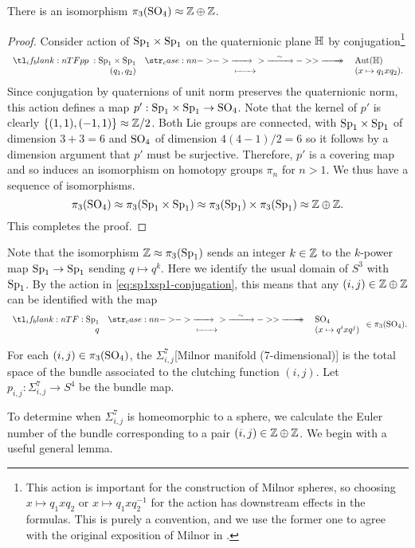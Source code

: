 \begin{proposition}\label{prop:3rd-homotopy-SO4}
	There is an isomorphism $\pi_3(\mathrm{SO}_4)\approx \mathbb{Z}\oplus \mathbb{Z}$.
\end{proposition}
\begin{proof}
	Consider action of $\mathrm{Sp}_1\times \mathrm{Sp}_1$ on the quaternionic plane $\mathbb{H}$ by conjugation\footnote{This action is important for the construction of Milnor spheres, so choosing $x\mapsto q_1xq_2$ or $x\mapsto q_1xq_2^{-1}$ for the action has downstream effects in the formulas. This is purely a convention, and we use the former one to agree with the original exposition of Milnor in \cite{milnor1956manifolds}.}
	\begin{equation}\label{eq:sp1xsp1-conjugation}
		\lkxfunc{p}{\Sp_1\times \Sp_1}{\Aut(\HH)}{(q_1,q_2)}{(x\mapsto q_1xq_2).}
	\end{equation}
	Since conjugation by quaternions of unit norm preserves the quaternionic norm, this action defines a map $p' : \mathrm{Sp}_1\times \mathrm{Sp}_1\to\mathrm{SO}_4$.
	Note that the kernel of $p'$ is clearly $\{(1,1),(-1,1)\}\approx \mathbb{Z}/2$. Both Lie groups are connected, with $\mathrm{Sp}_1\times \mathrm{Sp}_1$ of dimension $3+3=6$ and $\mathrm{SO}_4$ of dimension $4(4-1)/2=6$ so it follows by a dimension argument that $p'$ must be surjective. Therefore, $p'$ is a covering map and so induces an isomorphism on homotopy groups $\pi_n$ for $n>1$. We thus have a sequence of isomorphisms.
	\[
		\pi_3(\mathrm{SO}_4)\approx \pi_3(\mathrm{Sp}_1\times \mathrm{Sp}_1)\approx \pi_3(\mathrm{Sp}_1)\times \pi_3(\mathrm{Sp}_1) \approx \mathbb{Z}\oplus \mathbb{Z}.
	\]
	This completes the proof.
\end{proof}

Note that the isomorphism $\mathbb{Z}\approx \pi_3(\mathrm{Sp}_1)$ sends an integer $k\in \mathbb{Z}$ to the $k$-power map $\mathrm{Sp}_1\to \mathrm{Sp}_1$ sending $q\mapsto q^k$. Here we identify the usual domain of $S^3$ with $\mathrm{Sp}_1$. By the action in \cref{eq:sp1xsp1-conjugation}, this means that any $(i,j)\in \mathbb{Z}\oplus\mathbb{Z}$ can be identified with the map
\begin{equation}\label{eq:ij-associated-map}
	\lkxfunc{}{\Sp_1}{\SO_4}{q}{(x\mapsto q^ixq^{j})}\in \pi_3(\SO_4).
\end{equation}
\begin{definition}
For each $(i,j)\in \pi_3(\mathrm{SO}_4)$, the  $\Sigma_{i,j}^7$[Milnor manifold (7-dimensional)] is the total space of the bundle associated to the clutching function $(i,j)$. Let $p_{i,j} : \Sigma_{i,j}^7 \to S^4$ be the bundle map.
\end{definition}

To determine when $\Sigma_{i,j}^7$ is homeomorphic to a sphere, we calculate the Euler number of the bundle corresponding to a pair $(i,j)\in \mathbb{Z}\oplus\mathbb{Z}$. We begin with a useful general lemma.

